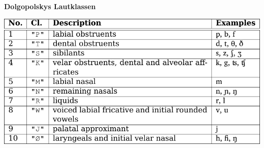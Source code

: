 \par\noindent\textbf{Dolgopolskys Lautklassen}

\includegraphics[width=\textwidth]{img/dolgopolsky.pdf}

